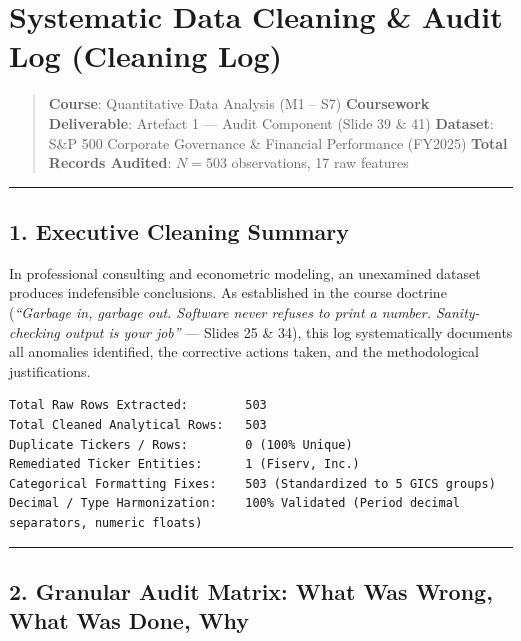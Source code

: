 \documentclass[
]{article}
\author{}
\date{}
\begin{document}
\section{Systematic Data Cleaning \& Audit Log (Cleaning
Log)}\label{systematic-data-cleaning-audit-log-cleaning-log}

\begin{quote}
\textbf{Course}: Quantitative Data Analysis (M1 -- S7)
\textbf{Coursework Deliverable}: Artefact 1 --- Audit Component (Slide
39 \& 41) \textbf{Dataset}: S\&P 500 Corporate Governance \& Financial
Performance (FY2025) \textbf{Total Records Audited}: \(N = 503\)
observations, 17 raw features
\end{quote}

\begin{center}\rule{0.5\linewidth}{0.5pt}\end{center}

\subsection{1. Executive Cleaning
Summary}\label{executive-cleaning-summary}

In professional consulting and econometric modeling, an unexamined
dataset produces indefensible conclusions. As established in the course
doctrine (\emph{``Garbage in, garbage out. Software never refuses to
print a number. Sanity-checking output is your job''} --- Slides 25 \&
34), this log systematically documents all anomalies identified, the
corrective actions taken, and the methodological justifications.

\begin{verbatim}
Total Raw Rows Extracted:        503
Total Cleaned Analytical Rows:   503
Duplicate Tickers / Rows:        0 (100% Unique)
Remediated Ticker Entities:      1 (Fiserv, Inc.)
Categorical Formatting Fixes:    503 (Standardized to 5 GICS groups)
Decimal / Type Harmonization:    100% Validated (Period decimal separators, numeric floats)
\end{verbatim}

\begin{center}\rule{0.5\linewidth}{0.5pt}\end{center}

\subsection{2. Granular Audit Matrix: What Was Wrong, What Was Done,
Why}\label{granular-audit-matrix-what-was-wrong-what-was-done-why}
\end{document}
